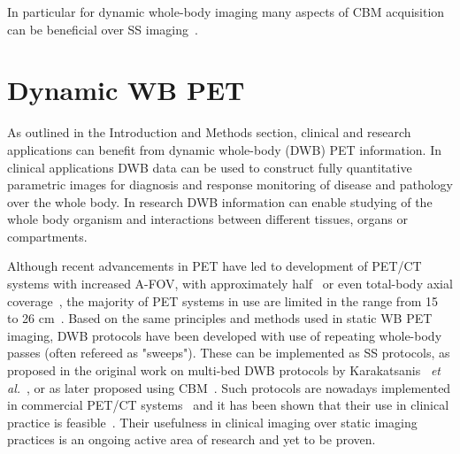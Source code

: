 In particular for dynamic whole-body imaging many aspects of CBM acquisition can be beneficial over SS imaging~\cite{Karakatsanis2016}.  

\section{Dynamic WB PET}
As outlined in the Introduction and Methods section, clinical and research applications can benefit from dynamic whole-body (DWB) PET information. In clinical applications DWB data can be used to construct fully quantitative parametric images for diagnosis and response monitoring of disease and pathology over the whole body. In research DWB information can enable studying of the whole body organism and interactions between different tissues, organs or compartments. 

Although recent advancements in PET have led to development of PET/CT systems with increased A-FOV, with approximately half~\cite{Karp2020,Siegel2020} or even total-body axial coverage~\cite{Cherry2018}, the majority of PET systems in use are limited in the range from 15 to 26 cm~\cite{Vandenberghe2020}. 
Based on the same principles and methods used in static WB PET imaging, DWB protocols have been developed with use of repeating whole-body passes (often refereed as "sweeps"). These can be implemented as SS protocols, as proposed in the original work on multi-bed DWB protocols by Karakatsanis ~\textit{et al.}~\cite{Karakatsanis2011,Karakatsanis2013}, or as later proposed using CBM~\cite{Karakatsanis2016,Hu2020}. Such protocols are nowadays implemented in commercial PET/CT systems~\cite{Hu2020} and it has been shown that their use in clinical practice is feasible~\cite{Fahrni2019,Dias2020}.  Their usefulness in clinical imaging over static imaging practices is an ongoing active area of research and yet to be proven. 

